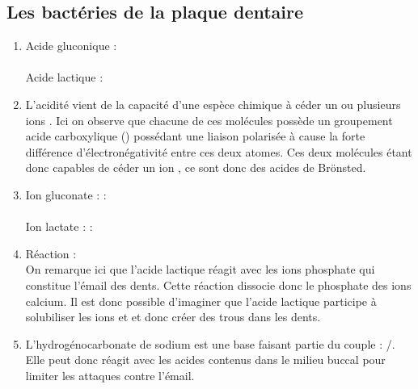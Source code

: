 \documentclass[a4paper,11pt,fleqn]{article}%
\begin{document}
	\subsection{Les bactéries de la plaque dentaire}
	\begin{enumerate}[resume]
		\item Acide gluconique : \\
		
				 \\
		
		Acide lactique : \\
		
		\item L'acidité vient de la capacité d'une espèce chimique à céder un ou plusieurs ions . Ici on observe que chacune de ces molécules possède un groupement acide carboxylique () possédant une liaison  polarisée à cause la forte différence d'électronégativité entre ces deux atomes. Ces deux molécules étant donc capables de céder un ion , ce sont donc des acides de Brönsted.
		\item Ion gluconate :  :\\
		
		\\
		Ion lactate :  :\\
		
		\item Réaction :  \\
		On remarque ici que l'acide lactique réagit avec les ions phosphate qui constitue l'émail des dents. Cette réaction dissocie donc le phosphate des ions calcium. Il est donc possible d'imaginer que l'acide lactique participe à solubiliser les ions  et  et donc créer des trous dans les dents.
		\item L'hydrogénocarbonate de sodium est une base faisant partie du couple :  /. Elle peut donc réagit avec les acides contenus dans le milieu buccal pour limiter les attaques contre l'émail.
	\end{enumerate}
	
\end{document}
